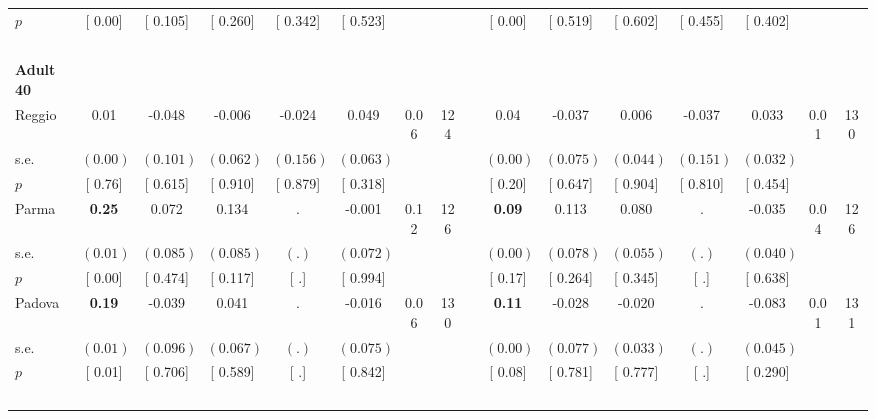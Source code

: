 \begin{longtable}{L{8em} c c c c c c c p{1em} c c c c c c c}
\quad \quad \quad \quad $ p$ & [     0.00] & [    0.105] & [    0.260] & [    0.342] & [    0.523] & & & & [     0.00] & [    0.519] & [    0.602] & [    0.455] & [    0.402] & &  \\[1em]
~\\[1em]
\quad \quad \textbf{Adult 40} & & & & & & & & & & & & & & & \\* 
\quad \quad \quad Reggio& 0.01 &    -0.048 &    -0.006 &    -0.024 &     0.049 &      0.06 &       124 & & 0.04 &    -0.037 &     0.006 &    -0.037 &     0.033 &      0.01 &       130  \\*
\quad \quad \quad \quad s.e.& $ (     0.00)$ & $ (    0.101)$ & $ (    0.062)$ & $ (    0.156)$ & $ (    0.063)$ & & & & $ (     0.00)$ & $ (    0.075)$ & $ (    0.044)$ & $ (    0.151)$ & $ (    0.032)$ & &  \\*
\quad \quad \quad \quad $ p$ & [     0.76] & [    0.615] & [    0.910] & [    0.879] & [    0.318] & & & & [     0.20] & [    0.647] & [    0.904] & [    0.810] & [    0.454] & &  \\[1em]
\quad \quad \quad Parma& \textbf{     0.25} &     0.072 &     0.134 &         . &    -0.001 &      0.12 &       126 & & \textbf{     0.09} &     0.113 &     0.080 &         . &    -0.035 &      0.04 &       126  \\*
\quad \quad \quad \quad s.e.& $ (     0.01)$ & $ (    0.085)$ & $ (    0.085)$ & $ (        .)$ & $ (    0.072)$ & & & & $ (     0.00)$ & $ (    0.078)$ & $ (    0.055)$ & $ (        .)$ & $ (    0.040)$ & &  \\*
\quad \quad \quad \quad $ p$ & [     0.00] & [    0.474] & [    0.117] & [        .] & [    0.994] & & & & [     0.17] & [    0.264] & [    0.345] & [        .] & [    0.638] & &  \\[1em]
\quad \quad \quad Padova& \textbf{     0.19} &    -0.039 &     0.041 &         . &    -0.016 &      0.06 &       130 & & \textbf{     0.11} &    -0.028 &    -0.020 &         . &    -0.083 &      0.01 &       131  \\*
\quad \quad \quad \quad s.e.& $ (     0.01)$ & $ (    0.096)$ & $ (    0.067)$ & $ (        .)$ & $ (    0.075)$ & & & & $ (     0.00)$ & $ (    0.077)$ & $ (    0.033)$ & $ (        .)$ & $ (    0.045)$ & &  \\*
\quad \quad \quad \quad $ p$ & [     0.01] & [    0.706] & [    0.589] & [        .] & [    0.842] & & & & [     0.08] & [    0.781] & [    0.777] & [        .] & [    0.290] & &  \\[1em]
~\\[1em]

\end{longtable}
